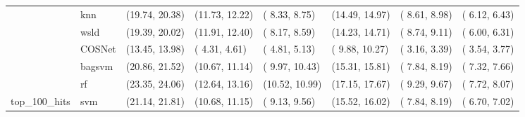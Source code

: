 \begin{table}[H]
{\begin{tabular}{llllllll}
 & knn & (19.74, 20.38) & (11.73, 12.22) & ( 8.33,  8.75) & (14.49, 14.97) & ( 8.61,  8.98) & ( 6.12,  6.43)\\

 & wsld & (19.39, 20.02) & (11.91, 12.40) & ( 8.17,  8.59) & (14.23, 14.71) & ( 8.74,  9.11) & ( 6.00,  6.31)\\

 & COSNet & (13.45, 13.98) & ( 4.31,  4.61) & ( 4.81,  5.13) & ( 9.88, 10.27) & ( 3.16,  3.39) & ( 3.54,  3.77)\\

 & bagsvm & (20.86, 21.52) & (10.67, 11.14) & ( 9.97, 10.43) & (15.31, 15.81) & ( 7.84,  8.19) & ( 7.32,  7.66)\\

 & rf & (23.35, 24.06) & (12.64, 13.16) & (10.52, 10.99) & (17.15, 17.67) & ( 9.29,  9.67) & ( 7.72,  8.07)\\

\multirow{-15}{*}{\raggedright\arraybackslash top\_100\_hits} & svm & (21.14, 21.81) & (10.68, 11.15) & ( 9.13,  9.56) & (15.52, 16.02) & ( 7.84,  8.19) & ( 6.70,  7.02)\\
\bottomrule
\end{tabular}}
\end{table}
